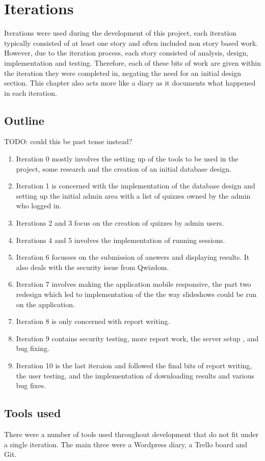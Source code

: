 \chapter{Iterations}
Iterations were used during the development of this project, each iteration typically consisted of at least one story and often included non story based work. However, due to the iteration process, each story consisted of analysis, design, implementation and testing. Therefore, each of these bits of work are given within the iteration they were completed in, negating the need for an initial design section. This chapter also acts more like a diary as it documents what happened in each iteration.

\section{Outline}
TODO: could this be past tense instead?
\begin{enumerate}
	\item Iteration 0 mostly involves the setting up of the tools to be used in the project, some research and the creation of an initial database design.
	\item Iteration 1 is concerned with the implementation of the database design and setting up the initial admin area with a list of quizzes owned by the admin who logged in.
	\item Iterations 2 and 3 focus on the creation of quizzes by admin users.
	\item Iterations 4 and 5 involves the implementation of running sessions.
	\item Iteration 6 focusses on the submission of answers and displaying results. It also deals with the security issue from Qwizdom.
	\item Iteration 7 involves making the application mobile responsive, the part two redesign which led to implementation of the the way slideshows could be run on the application.
	\item Iteration 8 is only concerned with report writing.
	\item Iteration 9 contains security testing, more report work, the server setup , and bug fixing.
	\item Iteration 10 is the last iteraion and followed the final bits of report writing, the user testing, and the implementation of downloading results and various bug fixes.
\end{enumerate}

\section{Tools used}
There were a number of tools used throughout development that do not fit under a single iteration. The main three were a Wordpress diary, a Trello board and Git. 


